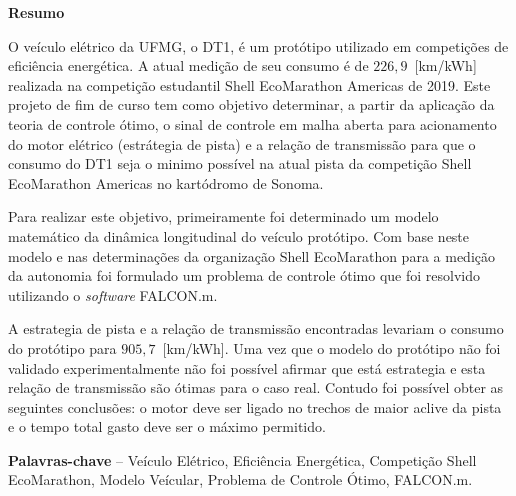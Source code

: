 
\begin{center}
\huge{{\bf Resumo}}
\vspace{2cm}
\end{center}

 

O veículo elétrico da UFMG, o DT1, é um protótipo utilizado em competições de eficiência energética.
A atual medição de seu consumo é de $226,9$~[km/kWh] realizada na competição estudantil Shell EcoMarathon Americas de 2019.
Este projeto de fim de curso tem como objetivo determinar, a partir da aplicação da teoria de controle ótimo, o sinal de controle em malha aberta para acionamento do motor 
elétrico (estrátegia de pista) e a relação de transmissão para que o consumo do DT1 seja o minimo possível na atual pista da competição Shell EcoMarathon Americas no kartódromo de Sonoma.

Para realizar este objetivo, primeiramente foi determinado um modelo matemático da dinâmica longitudinal do veículo protótipo. Com base neste modelo
e nas determinações da organização Shell EcoMarathon para a medição da autonomia foi formulado um problema de controle ótimo que foi resolvido utilizando o
\textit{software} FALCON.m. 

A estrategia de pista e a relação de transmissão encontradas levariam o consumo do protótipo para $905,7$~[km/kWh]. Uma vez que o modelo do protótipo 
não foi validado experimentalmente não foi possível afirmar que está estrategia e esta relação de transmissão são ótimas para o caso real. Contudo foi possível
obter as seguintes conclusões: o motor deve ser ligado no trechos de maior aclive da pista e o tempo total gasto deve ser o máximo permitido. 
 
\textbf{Palavras-chave} -- Veículo Elétrico, Eficiência Energética, Competição Shell EcoMarathon, Modelo Veícular, Problema de Controle Ótimo, FALCON.m.

\clearpage
\thispagestyle{empty}
\cleardoublepage

